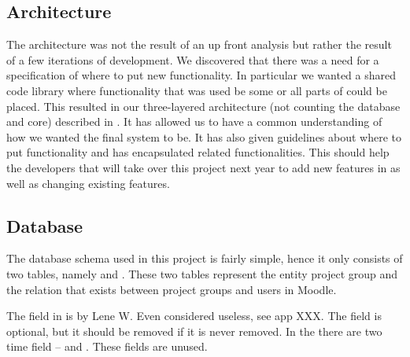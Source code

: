 



\subsection{Architecture}



The architecture was not the result of an up front analysis but rather the result of a few iterations of development.
We discovered that there was a need for a specification of where to put new functionality.
In particular we wanted a shared code library where functionality that was used be some or all parts of \system{} could be placed.
This resulted in our three-layered architecture (not counting the database and \moodle{} core) described in .
It has allowed us to have a common understanding of how we wanted the final system to be.
It has also given guidelines about where to put functionality and has encapsulated related functionalities.
This should help the developers that will take over this project next year to add new features in as well as changing existing features.



\subsection{Database}
The database schema used in this project is fairly simple, hence it only consists of two tables, namely   and . 
These two tables represent the entity project group and the relation that exists between project groups and users in Moodle. 

The  field in  is by Lene W. Even considered useless, see app XXX. 
The field is optional, but it should be removed if it is never removed. 
In the  there are two time field --  and . 
These fields are unused. 

